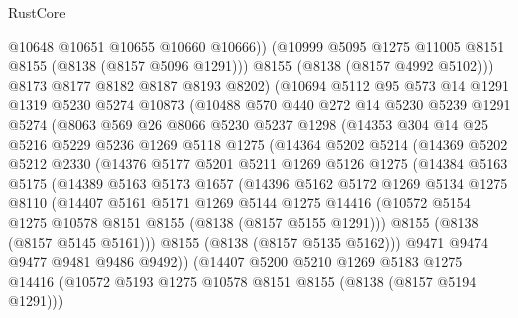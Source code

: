 \begin{lexlean}{RustCore}
\begin{coremodule}
              @10648
              @10651
              @10655
              @10660
              @10666))
          (@10999 @5095 @1275 @11005 @8151 @8155 (@8138 (@8157 @5096 @1291)))
          @8155
          (@8138 (@8157 @4992 @5102)))
        @8173
        @8177
        @8182
        @8187
        @8193
        @8202)
      (@10694
        @5112
        @95
        @573
        @14
        @1291
        @1319
        @5230
        @5274
        @10873
        (@10488
          @570
          @440
          @272
          @14
          @5230
          @5239
          @1291
          @5274
          (@8063
            @569
            @26
            @8066
            @5230
            @5237
            @1298
            (@14353
              @304
              @14
              @25
              @5216
              @5229
              @5236
              @1269
              @5118
              @1275
              (@14364
                @5202
                @5214
                (@14369
                  @5202
                  @5212
                  @2330
                  (@14376
                    @5177
                    @5201
                    @5211
                    @1269
                    @5126
                    @1275
                    (@14384
                      @5163
                      @5175
                      (@14389
                        @5163
                        @5173
                        @1657
                        (@14396
                          @5162
                          @5172
                          @1269
                          @5134
                          @1275
                          @8110
                          (@14407
                            @5161
                            @5171
                            @1269
                            @5144
                            @1275
                            @14416
                            (@10572 @5154 @1275 @10578 @8151 @8155 (@8138 (@8157 @5155 @1291)))
                            @8155
                            (@8138 (@8157 @5145 @5161)))
                          @8155
                          (@8138 (@8157 @5135 @5162)))
                        @9471
                        @9474
                        @9477
                        @9481
                        @9486
                        @9492))
                    (@14407
                      @5200
                      @5210
                      @1269
                      @5183
                      @1275
                      @14416
                      (@10572 @5193 @1275 @10578 @8151 @8155 (@8138 (@8157 @5194 @1291)))

\end{coremodule}
\end{lexlean}
